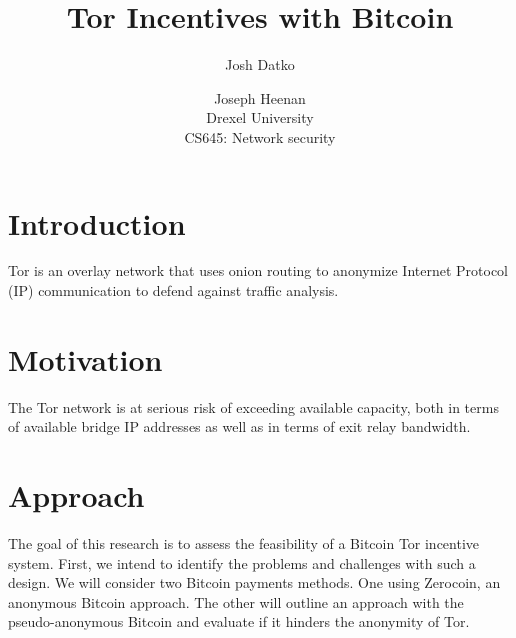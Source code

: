 \documentclass[letterpaper]{article}
\begin{document}
\setcounter{secnumdepth}{1}
\title{Tor Incentives with Bitcoin}
\author{Josh Datko \and Joseph Heenan\\ Drexel University\\
CS645: Network security\\
}
\maketitle



\section{Introduction}\label{sec:intro}

Tor is an overlay network that uses onion routing to anonymize
Internet Protocol (IP) communication to defend against traffic
analysis.


\section{Motivation}\label{sec:motivation}

The Tor network is at serious risk of exceeding available capacity,
both in terms of available bridge IP addresses as well as in terms of
exit relay bandwidth\cite{tor-internet-days}.

\section{Approach}\label{sec:approach}

The goal of this research is to assess the feasibility of a Bitcoin
Tor incentive system.  First, we intend to identify the problems and
challenges with such a design. We will consider two Bitcoin payments
methods.  One using Zerocoin\cite{Miers:2013:ZAD:2497621.2498124}, an
anonymous Bitcoin approach.  The other will outline an approach with
the pseudo-anonymous Bitcoin and evaluate if it hinders the anonymity
of Tor.
\end{document}
